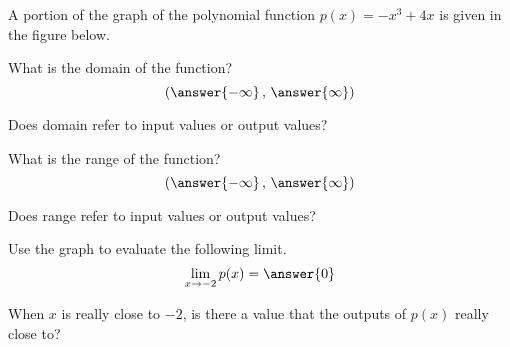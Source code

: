 \documentclass{ximera}
\author{Bobby Ramsey}
\begin{document}
	A portion of the graph of the polynomial function $p(x) = -x^3 + 4x$ is given in the figure below.
	
	\begin{image}
	\end{image}
\begin{exercise}
	What is the domain of the function?
	\[ \left( \answer{-\infty}\, , \, \answer{\infty}\right) \]
\end{exercise}
\begin{hint}
	Does domain refer to input values or output values?
\end{hint}
\begin{exercise}
	What is the range of the function?
	\[ \left( \answer{-\infty}\, , \, \answer{\infty}\right) \]	
\end{exercise}
\begin{hint}
	Does range refer to input values or output values?
\end{hint}
\begin{exercise}
	Use the graph to evaluate the following limit.
	\[ \lim_{x\to -2} p(x) = \answer{0} \]	
\end{exercise}
\begin{hint}
	When $x$ is really close to $-2$, is there a value that the outputs of $p(x)$ really close to?
\end{hint}
\end{document}
